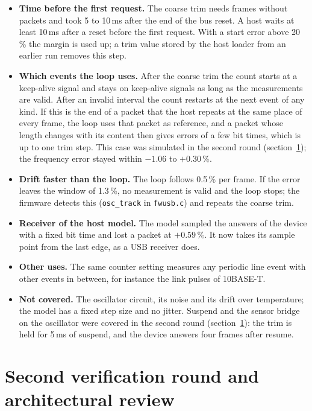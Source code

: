 \documentclass[10pt,a4paper]{article}
\begin{document}
\begin{itemize}
\item \textbf{Time before the first request.} The coarse trim needs frames without packets and took 5 to 10\,ms
after the end of the bus reset. A host waits at least 10\,ms after a reset before the first request. With a start
error above 20\,\% the margin is used up; a trim value stored by the host loader from an earlier run removes
this step.
\item \textbf{Which events the loop uses.} After the coarse trim the count starts at a keep-alive signal and stays on
keep-alive signals as long as the measurements are valid. After an invalid interval the count restarts at the
next event of any kind. If this is the end of a packet that the host repeats at the same place of every frame,
the loop uses that packet as reference, and a packet whose length changes with its content then gives
errors of a few bit times, which is up to one trim step. This case was simulated in the second round (section~\ref{sec:review}); the frequency error stayed within $-1.06$ to $+0.30\,\%$.
\item \textbf{Drift faster than the loop.} The loop follows 0.5\,\% per frame. If the error leaves the window of
1.3\,\%, no measurement is valid and the loop stops; the firmware detects this (\texttt{osc\_track} in \texttt{fwusb.c}) and repeats the coarse trim.
\item \textbf{Receiver of the host model.} The model sampled the answers of the device with a fixed bit time and
lost a packet at $+0.59\,\%$. It now takes its sample point from the last edge, as a USB receiver does.
\item \textbf{Other uses.} The same counter setting measures any periodic line event with other events in between,
for instance the link pulses of 10BASE-T.
\item \textbf{Not covered.} The oscillator circuit, its noise and its drift over temperature; the model has
a fixed step size and no jitter. Suspend and the sensor bridge on the oscillator were covered in the second
round (section~\ref{sec:review}): the trim is held for 5\,ms of suspend, and the device answers four frames
after resume.
\end{itemize}

\section{Second verification round and architectural review}\label{sec:review}
\end{document}
